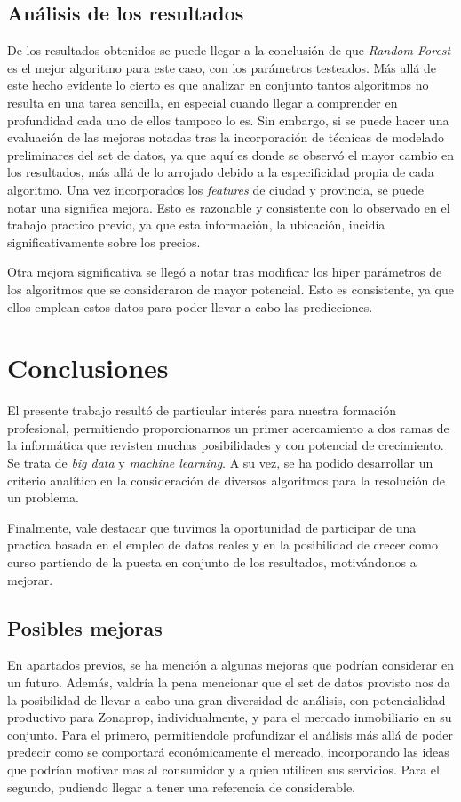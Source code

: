 \documentclass[titlepage,a4paper,11pt]{article}
\begin{document}
\subsection{Análisis de los resultados}
De los resultados obtenidos se puede llegar a la conclusión de que \textit{Random Forest} es el mejor algoritmo para este caso, con los parámetros testeados. Más allá de este hecho evidente lo cierto es que analizar en conjunto tantos algoritmos no resulta en una tarea sencilla, en especial cuando llegar a comprender en profundidad cada uno de ellos tampoco lo es. Sin embargo, si se puede hacer una evaluación de las mejoras notadas tras la incorporación de técnicas de modelado preliminares del set de datos, ya que aquí es donde se observó el mayor cambio en los resultados, más allá de lo arrojado debido a la especificidad propia de cada algoritmo. Una vez incorporados los \textit{features} de ciudad y provincia, se puede notar una significa mejora. Esto es razonable y consistente con lo observado en el trabajo practico previo, ya que esta información, la ubicación, incidía significativamente sobre los precios.

Otra mejora significativa se llegó a notar tras modificar los hiper parámetros de los algoritmos que se consideraron de mayor potencial. Esto es consistente, ya que ellos emplean estos datos para poder llevar a cabo las predicciones.

\section{Conclusiones}
El presente trabajo resultó de particular interés para nuestra formación profesional, permitiendo proporcionarnos un primer acercamiento a dos ramas de la informática que revisten muchas posibilidades y con potencial de crecimiento. Se trata de \textit{big data} y \textit{machine learning}. A su vez, se ha podido desarrollar un criterio analítico en la consideración de diversos algoritmos para la resolución de un problema.

Finalmente, vale destacar que tuvimos la oportunidad de participar de una practica basada en el empleo de datos reales y en la posibilidad de crecer como curso partiendo de la puesta en conjunto de los resultados, motivándonos a mejorar.

\subsection{Posibles mejoras}
En apartados previos, se ha mención a algunas mejoras que podrían considerar en un futuro. Además, valdría la pena mencionar que el set de datos provisto nos da la posibilidad de llevar a cabo una gran diversidad de análisis, con potencialidad productivo para Zonaprop, individualmente, y para el mercado inmobiliario en su conjunto. Para el primero, permitiendole profundizar el análisis más allá de poder predecir como se comportará económicamente el mercado, incorporando las ideas que podrían motivar mas al consumidor y a quien utilicen sus servicios. Para el segundo, pudiendo llegar a tener una referencia de considerable.
\end{document}
